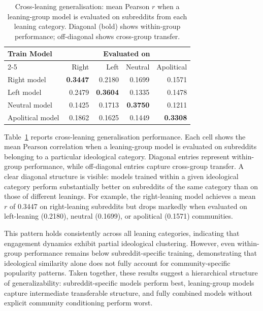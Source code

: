\begin{table}[htbp]
\centering
\caption{Cross-leaning generalisation: mean Pearson $r$ when a leaning-group model is evaluated on subreddits from each leaning category. Diagonal (bold) shows within-group performance; off-diagonal shows cross-group transfer.}
\label{tab:cross_leaning_pearson}
\begin{tabular}{lrrrr}
\toprule
\multirow{2}{*}{Train Model} & \multicolumn{4}{c}{Evaluated on} \\
\cmidrule(lr){2-5}
 & Right & Left & Neutral & Apolitical \\
\midrule
Right model      & \textbf{0.3447} & 0.2180 & 0.1699 & 0.1571 \\
Left model       & 0.2479 & \textbf{0.3604} & 0.1335 & 0.1478 \\
Neutral model    & 0.1425 & 0.1713 & \textbf{0.3750} & 0.1211 \\
Apolitical model & 0.1862 & 0.1625 & 0.1449 & \textbf{0.3308} \\
\bottomrule
\end{tabular}
\end{table}

Table~\ref{tab:cross_leaning_pearson} reports cross-leaning generalisation performance. Each cell shows the mean Pearson correlation when a leaning-group model is evaluated on subreddits belonging to a particular ideological category. Diagonal entries represent within-group performance, while off-diagonal entries capture cross-group transfer. A clear diagonal structure is visible: models trained within a given ideological category perform substantially better on subreddits of the same category than on those of different leanings. For example, the right-leaning model achieves a mean $r$ of 0.3447 on right-leaning subreddits but drops markedly when evaluated on left-leaning (0.2180), neutral (0.1699), or apolitical (0.1571) communities.

This pattern holds consistently across all leaning categories, indicating that engagement dynamics exhibit partial ideological clustering. However, even within-group performance remains below subreddit-specific training, demonstrating that ideological similarity alone does not fully account for community-specific popularity patterns. Taken together, these results suggest a hierarchical structure of generalizability: subreddit-specific models perform best, leaning-group models capture intermediate transferable structure, and fully combined models without explicit community conditioning perform worst.



